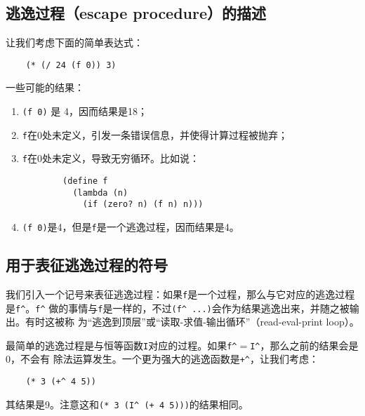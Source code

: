 \documentclass[12pt]{article}
\begin{document}
\subsection{逃逸过程（escape procedure）的描述}
\noindent{}让我们考虑下面的简单表达式：
\begin{verbatim}
    (* (/ 24 (f 0)) 3)
\end{verbatim}
\noindent{}一些可能的结果：
\begin{enumerate}
    \item \texttt{(f 0)} 是 4，因而结果是18；
    \item \texttt{f}在0处未定义，引发一条错误信息，并使得计算过程被抛弃；
    \item \texttt{f}在0处未定义，导致无穷循环。比如说：
    \begin{verbatim}
        (define f
          (lambda (n)
            (if (zero? n) (f n) n)))
    \end{verbatim}
    \item \texttt{(f 0)}是4，但是\texttt{f}是一个逃逸过程，因而结果是4。
\end{enumerate}

\subsection{用于表征逃逸过程的符号}
\indent{}我们引入一个记号来表征逃逸过程：如果\texttt{f}是一个过程，那么与它对应的逃逸过程是\texttt{f\^{}}。\texttt{f\^{}}
做的事情与\texttt{f}是一样的，不过\texttt{(f\^{} ...)}会作为结果逃逸出来，并随之被输出。有时这被称
为``逃逸到顶层''或``读取-求值-输出循环''（read-eval-print loop）。

\indent{}最简单的逃逸过程是与恒等函数\texttt{I}对应的过程。如果\texttt{f\^{}}$=$\texttt{I\^{}}，那么之前的结果会是0，不会有
除法运算发生。一个更为强大的逃逸函数是\texttt{+\^{}}，让我们考虑：
\begin{verbatim}
    (* 3 (+^ 4 5))
\end{verbatim}
其结果是9。注意这和\texttt{(* 3 (I\^{} (+ 4 5)))}的结果相同。
\end{document}
